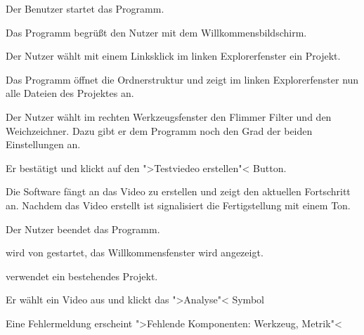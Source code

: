   \begin{compactenum}[1]
\item Der Benutzer startet das Programm.
\item Das Programm begrüßt den Nutzer mit dem Willkommensbildschirm.
\item Der Nutzer wählt mit einem Linksklick im linken Explorerfenster ein Projekt.
\item Das Programm öffnet die Ordnerstruktur und zeigt im linken Explorerfenster nun alle Dateien des Projektes an.
\item Der Nutzer wählt im rechten Werkzeugsfenster den Flimmer Filter und den Weichzeichner. Dazu gibt er dem Programm noch den Grad der beiden Einstellungen an.
\item Er bestätigt und klickt auf den ">Testviedeo erstellen"< Button.
\item Die Software fängt an das Video zu erstellen und zeigt den aktuellen Fortschritt an. Nachdem das Video erstellt ist signalisiert \projektTitel die Fertigstellung mit einem Ton.
\item Der Nutzer beendet das Programm.
\end{compactenum}

\begin{compactenum}[1]
\item \projektTitel wird von \dAU gestartet, das Willkommensfenster wird angezeigt.
\item \dAU verwendet ein bestehendes Projekt.
\item Er wählt ein Video aus und klickt das ">Analyse"< Symbol
\item Eine Fehlermeldung erscheint ">Fehlende Komponenten: Werkzeug, Metrik"<
\end{compactenum}